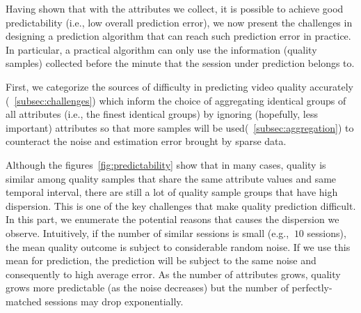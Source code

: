 {
}









Having shown that with the attributes we collect, it is possible to achieve good predictability (i.e., low overall prediction error), we now present the challenges in designing a prediction algorithm that can reach such prediction error in practice. In particular, a practical algorithm can only use the information (quality samples) collected before the minute that the session under prediction belongs to.

First, we categorize the sources of difficulty in predicting video quality accurately (\Section~\ref{subsec:challenges}) which inform the choice of aggregating identical groups of all attributes (i.e., the finest identical groups) by ignoring (hopefully, less important) attributes so that more samples will be used(\Section~\ref{subsec:aggregation}) to counteract the noise and estimation error brought by sparse data.


\label{subsec:challenges}
Although the figures~\ref{fig:predictability} show that in many cases, quality is similar among quality samples that share the same attribute values and same temporal interval, there are still a lot of quality sample groups that have high dispersion. This is one of the key challenges that make quality prediction difficult. 
In this part, we enumerate the potential reasons that causes the dispersion we observe. Intuitively, if the number of similar sessions is small (e.g., $~10$ sessions), the mean quality outcome is subject to considerable random noise.  If we use this mean for prediction, the prediction will be subject to the same noise and consequently to high average error.  As the number of attributes grows, quality grows more predictable (as the noise decreases) but the number of perfectly-matched sessions may drop exponentially.

